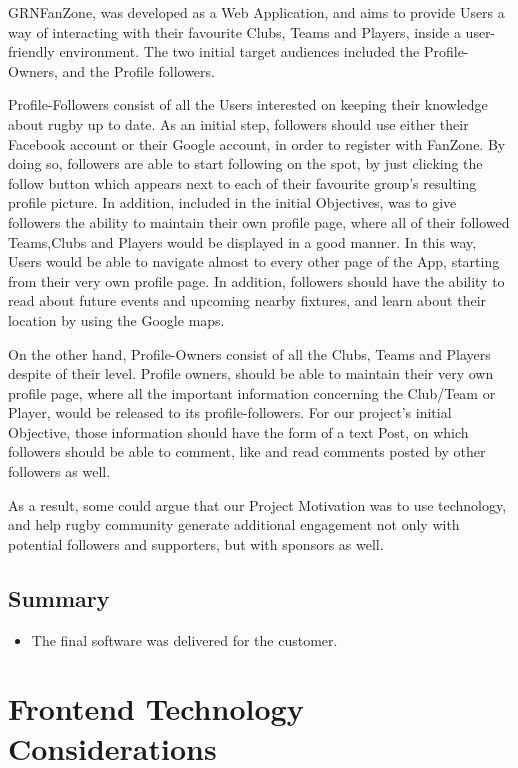 \documentclass{l3proj}
\begin{document}
GRNFanZone, was developed as a Web Application, and aims to provide Users a way of
interacting with their favourite Clubs, Teams and Players, inside a user-friendly
environment. The two initial target audiences included the Profile-Owners, and the
Profile followers.

Profile-Followers consist of all the Users interested on keeping their knowledge about
rugby up to date. As an initial step, followers should use either their Facebook account
or their Google account, in order to register with FanZone. By doing so, followers
are able to start following on the spot, by just clicking the follow button which
appears next to each of their favourite group's resulting profile picture. In addition,
included in the initial Objectives, was to give followers the ability to maintain their
own profile page, where all of their followed Teams,Clubs and Players would be displayed
in a good manner. In this way, Users would be able to navigate almost to every other
page of the App, starting from their very own profile page. In addition, followers
should have the ability to read about future events and upcoming nearby fixtures, and
learn about their location by using the Google maps.

On the other hand, Profile-Owners consist of all the Clubs, Teams and Players despite
of their level. Profile owners, should be able to maintain their very own profile page,
where all the important information concerning the Club/Team or Player, would be released
to its profile-followers. For our project's initial Objective, those information should
have the form of a text Post, on which followers should be able to comment, like and read
comments posted by other followers as well.

As a result, some could argue that our Project Motivation was to use technology, and help
rugby community generate additional engagement not only with potential followers and
supporters, but with sponsors as well.

\subsection{Summary}
\begin{itemize}
\item The final software was delivered for the customer.
\end{itemize}


\section{Frontend Technology Considerations}
\label{sec:frontend}
\end{document}
